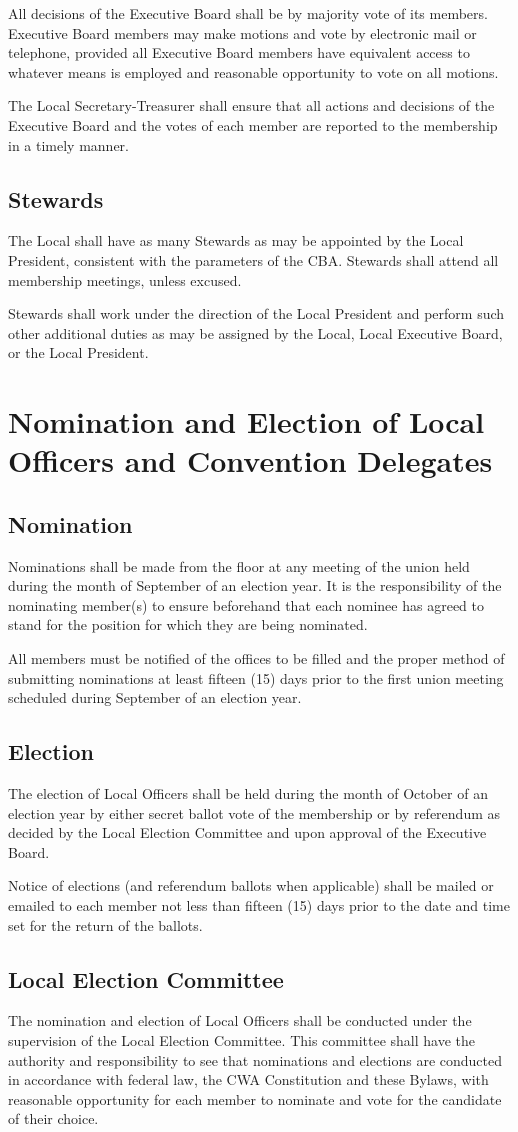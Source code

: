 \documentclass[11pt]{article}
\newcommand{\article}[1]{\vspace{.75cm}\section{#1}}
\newcommand{\articlesection}[1]{\vspace{.25cm}\subsection{#1}}
\begin{document}
All decisions of the Executive Board shall be by majority vote of its members. Executive Board members may make motions and vote by electronic mail or telephone, provided all Executive Board members have equivalent access to whatever means is employed and reasonable opportunity to vote on all motions.

The Local Secretary-Treasurer shall ensure that all actions and decisions of the Executive Board and the votes of each member are reported to the membership in a timely manner.

\articlesection{Stewards}
The Local shall have as many Stewards as may be appointed by the Local President, consistent with the parameters of the CBA. Stewards shall attend all membership meetings, unless excused.

Stewards shall work under the direction of the Local President and perform such other additional duties as may be assigned by the Local, Local Executive Board, or the Local President.

\article{Nomination and Election of Local Officers and Convention Delegates}
\articlesection{Nomination}
Nominations shall be made from the floor at any meeting of the union held during the month of September of an election year. It is the responsibility of the nominating member(s) to ensure beforehand that each nominee has agreed to stand for the position for which they are being nominated.

All members must be notified of the offices to be filled and the proper method of submitting nominations at least fifteen (15) days prior to the first union meeting scheduled during September of an election year.

\articlesection{Election}
The election of Local Officers shall be held during the month of October of an election year by either secret ballot vote of the membership or by referendum as decided by the Local Election Committee and upon approval of the Executive Board.

Notice of elections (and referendum ballots when applicable) shall be mailed or emailed to each member not less than fifteen (15) days prior to the date and time set for the return of the ballots.

\articlesection{Local Election Committee}
The nomination and election of Local Officers shall be conducted under the supervision of the Local Election Committee. This committee shall have the authority and responsibility to see that nominations and elections are conducted in accordance with federal law, the CWA Constitution and these Bylaws, with reasonable opportunity for each member to nominate and vote for the candidate of their choice.
\end{document}
